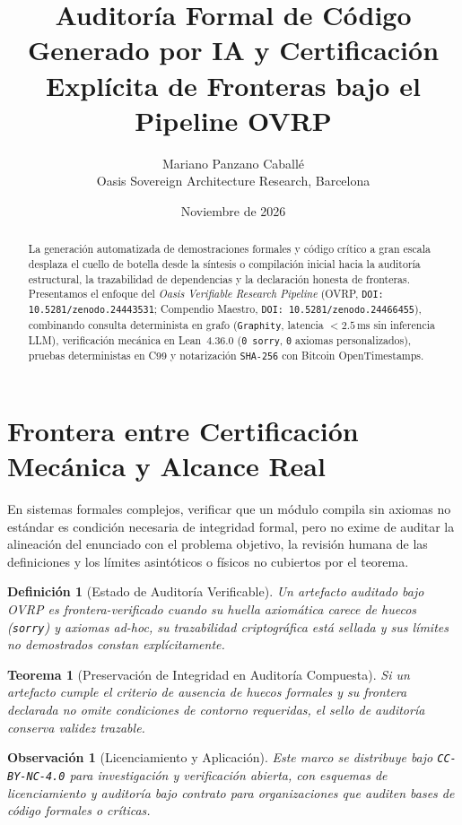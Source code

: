 \documentclass[11pt,a4paper]{article}
\title{Auditor\'ia Formal de C\'odigo Generado por IA y Certificaci\'on Expl\'icita de Fronteras bajo el Pipeline OVRP}
\author{Mariano Panzano Caball\'e \\ \small Oasis Sovereign Architecture Research, Barcelona}
\date{Noviembre de 2026}
\newtheorem{definition}{Definici\'on}
\newtheorem{theorem}{Teorema}
\newtheorem{remark}{Observaci\'on}
\begin{document}
\maketitle

\begin{abstract}
La generaci\'on automatizada de demostraciones formales y c\'odigo cr\'itico a gran escala desplaza el cuello de botella desde la s\'intesis o compilaci\'on inicial hacia la auditor\'ia estructural, la trazabilidad de dependencias y la declaraci\'on honesta de fronteras. Presentamos el enfoque del \emph{Oasis Verifiable Research Pipeline} (OVRP, \texttt{DOI: 10.5281/zenodo.24443531}; Compendio Maestro, \texttt{DOI: 10.5281/zenodo.24466455}), combinando consulta determinista en grafo (\texttt{Graphity}, latencia $< 2.5\,\text{ms}$ sin inferencia LLM), verificaci\'on mec\'anica en Lean~4.36.0 (\texttt{0 sorry}, \texttt{0} axiomas personalizados), pruebas deterministas en C99 y notarizaci\'on \texttt{SHA-256} con Bitcoin OpenTimestamps.
\end{abstract}

\section{Frontera entre Certificaci\'on Mec\'anica y Alcance Real}
En sistemas formales complejos, verificar que un m\'odulo compila sin axiomas no est\'andar es condici\'on necesaria de integridad formal, pero no exime de auditar la alineaci\'on del enunciado con el problema objetivo, la revisi\'on humana de las definiciones y los l\'imites asint\'oticos o f\'isicos no cubiertos por el teorema.

\begin{definition}[Estado de Auditor\'ia Verificable]
Un artefacto auditado bajo OVRP es \emph{frontera-verificado} cuando su huella axiom\'atica carece de huecos (\texttt{sorry}) y axiomas ad-hoc, su trazabilidad criptogr\'afica est\'a sellada y sus l\'imites no demostrados constan expl\'icitamente.
\end{definition}

\begin{theorem}[Preservaci\'on de Integridad en Auditor\'ia Compuesta]
Si un artefacto cumple el criterio de ausencia de huecos formales y su frontera declarada no omite condiciones de contorno requeridas, el sello de auditor\'ia conserva validez trazable.
\end{theorem}

\begin{remark}[Licenciamiento y Aplicaci\'on]
Este marco se distribuye bajo \texttt{CC-BY-NC-4.0} para investigaci\'on y verificaci\'on abierta, con esquemas de licenciamiento y auditor\'ia bajo contrato para organizaciones que auditen bases de c\'odigo formales o cr\'iticas.
\end{remark}
\end{document}
